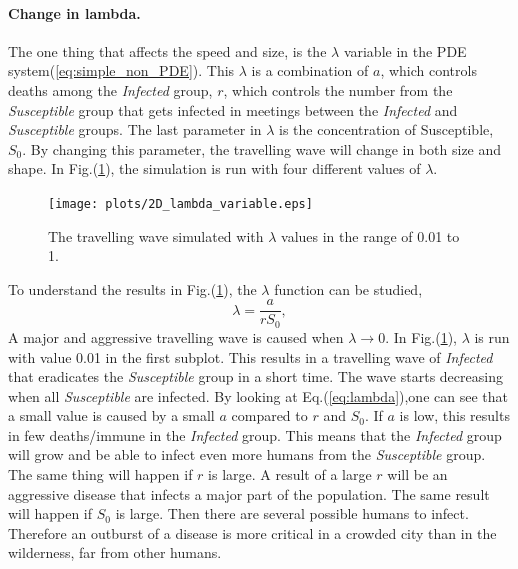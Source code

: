 \documentclass[%
twoside,                 %
final,                   %
10pt]{article}
\begin{document}
\paragraph{Change in lambda.}
The one thing that affects the speed and size, is the $\lambda$ variable in the PDE system(\ref{eq:simple_non_PDE}). This $\lambda$ is a combination of $a$, which controls deaths among the \emph{Infected} group, $r$, which controls the number from the \emph{Susceptible} group that gets infected in meetings between the \emph{Infected} and \emph{Susceptible} groups. The last parameter in $\lambda$ is the concentration of Susceptible, $S_0$. By changing this parameter, the travelling wave will change in both size and shape. In Fig.(\ref{fig:change_lambda}), the simulation is run with four different values of $\lambda$.


\begin{figure}[ht]
  \centerline{\texttt{[image: plots/2D\_lambda\_variable.eps]}}
  \caption{
  \label{fig:change_lambda} The travelling wave simulated with $\lambda$ values in the range of 0.01 to 1.
  }
\end{figure}




\vspace{3mm}




\vspace{3mm}


To understand the results in Fig.(\ref{fig:change_lambda}), the $\lambda $ function can be studied,
\begin{equation} \label{eq:lambda}
 \lambda =\frac{a}{rS_0},
\end{equation}
A major and aggressive travelling wave is caused when $\lambda \rightarrow 0$. In Fig.(\ref{fig:change_lambda}), $\lambda$ is run with value 0.01 in the first subplot. This results in a travelling wave of \emph{Infected} that eradicates the \emph{Susceptible} group in a short time. The wave starts decreasing when all \emph{Susceptible} are infected. By looking at Eq.(\ref{eq:lambda}),one can see that a small value is caused by a small $a$ compared to $r$ and $S_0$. If $a$ is low, this results in few deaths/immune in the \emph{Infected} group. This means that the \emph{Infected} group will grow and be able to infect even more humans from the \emph{Susceptible} group. The same thing will happen if $r$ is large. A result of a large $r$ will be an aggressive disease that infects  a major part of the population. The same result will happen if $S_0$ is large. Then there are several possible humans to infect. Therefore an outburst of a disease is more critical in a crowded city than in the wilderness, far from other humans.
\end{document}
